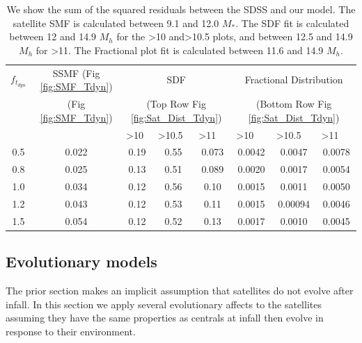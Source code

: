 \begin{table}
\centering
\caption{We show the sum of the squared residuals between the SDSS and our model. The satellite SMF is calculated between 9.1 and 12.0 $M_{*}$. The SDF fit is calculated between 12 and 14.9 $M_h$ for the \textgreater10 and\textgreater10.5 plots, and between 12.5 and 14.9 $M_h$ for \textgreater11. The Fractional plot fit is calculated between 11.6 and 14.9 $M_h$.}
\label{tab:bestfit}
\begin{tabular}{c|c|ccc|ccc}
$f_{t_{dyn}}$   & SSMF   (Fig \ref{fig:SMF_Tdyn})               & \multicolumn{3}{c}{SDF  } \vline & \multicolumn{3}{c}{Fractional Distribution } \\
   &   (Fig \ref{fig:SMF_Tdyn})               & \multicolumn{3}{c}{ (Top Row Fig \ref{fig:Sat_Dist_Tdyn}) } \vline & \multicolumn{3}{c}{ (Bottom Row Fig \ref{fig:Sat_Dist_Tdyn})} \\ \hline
            \multicolumn{1}{l}{} \vline & \multicolumn{1}{l}{} \vline & \multicolumn{1}{l}{\textgreater{}10} & \multicolumn{1}{l}{\textgreater{}10.5} & \multicolumn{1}{l}{\textgreater{}11} \vline & \multicolumn{1}{l}{\textgreater{}10} & \multicolumn{1}{l}{\textgreater{}10.5} & \multicolumn{1}{l}{\textgreater{}11} \\ \hline
0.5    & 0.022   & 0.19  & 0.55    & 0.073    & 0.0042 & 0.0047 & 0.0078  \\
0.8    & 0.025   & 0.13  & 0.51    & 0.089    & 0.0020 & 0.0017 & 0.0054  \\
1.0    & 0.034   & 0.12  & 0.56    & 0.10     & 0.0015 & 0.0011 & 0.0050  \\
1.2    & 0.043   & 0.12  & 0.53    & 0.11     & 0.0015 & 0.00094& 0.0046  \\
1.5    & 0.054   & 0.12  & 0.52    & 0.13     & 0.0017 & 0.0010 & 0.0045                              
\end{tabular}
\end{table}

\subsection{Evolutionary models}

The prior section makes an implicit assumption that satellites do not evolve after infall. In this section we apply several evolutionary affects to the satellites assuming they have the same properties as centrals at infall then evolve in response to their environment. 


